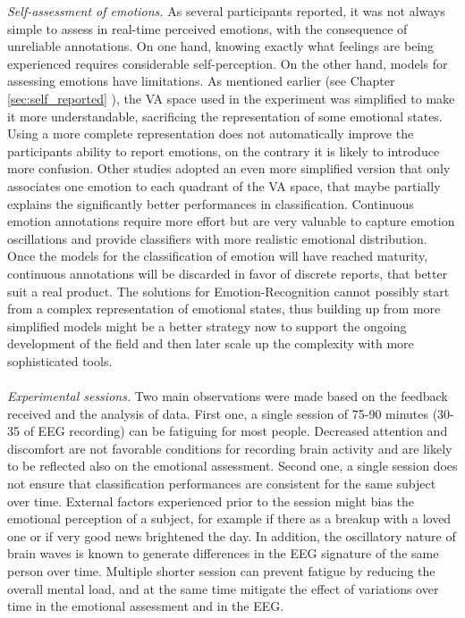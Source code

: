 \emph{Self-assessment of emotions.} As several participants reported, it was not always simple to assess in real-time perceived emotions, with the consequence of unreliable annotations. On one hand, knowing exactly what feelings are being experienced requires considerable self-perception. On the other hand, models for assessing emotions have limitations. As mentioned earlier (see Chapter \ref{sec:self_reported} ), the \ac{VA} space used in the experiment was simplified to make it more understandable, sacrificing the representation of some emotional states. Using a more complete representation does not automatically improve the participants ability to report emotions, on the contrary it is likely to introduce more confusion. Other studies \cite{lin_eeg-based_2010} adopted an even more simplified version that only associates one emotion to each quadrant of the \ac{VA} space, that maybe partially explains the significantly better performances in classification. Continuous emotion annotations require more effort but are very valuable to capture emotion oscillations and provide classifiers with more realistic emotional distribution. Once the models for the classification of emotion will have reached maturity, continuous annotations will be discarded in favor of discrete reports, that better suit a real product. The solutions for Emotion-Recognition cannot possibly start from a complex representation of emotional states, thus building up from more simplified models might be a better strategy now to support the ongoing development of the field and then later scale up the complexity with more sophisticated tools.
\\
\\
\emph{Experimental sessions.} Two main observations were made based on the feedback received and the analysis of data. First one, a single session of 75-90 minutes (30-35 of \ac{EEG} recording) can be fatiguing for most people. Decreased attention and discomfort are not favorable conditions for recording brain activity and are likely to be reflected also on the emotional assessment. Second one, a single session does not ensure that classification performances are consistent for the same subject over time. External factors experienced prior to the session might bias the emotional perception of a subject, for example if there as a breakup with a loved one or if very good news brightened the day. In addition, the oscillatory nature of brain waves is known to generate differences in the \ac{EEG} signature of the same person over time. Multiple shorter session can prevent fatigue by reducing the overall mental load, and at the same time mitigate the effect of variations over time in the emotional assessment and in the \ac{EEG}.  
